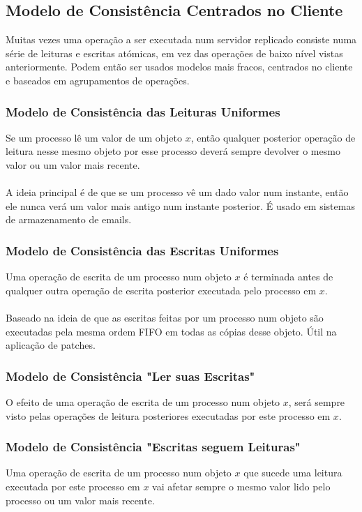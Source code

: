 \documentclass[10pt,a4paper]{report}
\begin{document}
\subsection{Modelo de Consistência Centrados no Cliente}
Muitas vezes uma operação a ser executada num servidor replicado consiste numa série de leituras e escritas atómicas, em vez das operações de baixo nível vistas anteriormente. Podem então ser usados modelos mais fracos, centrados no cliente e baseados em agrupamentos de operações.
\subsubsection{Modelo de Consistência das Leituras Uniformes}
Se um processo lê um valor de um objeto $x$, então qualquer posterior operação de leitura nesse mesmo objeto por esse processo deverá sempre devolver o mesmo valor ou um valor mais recente.\\
\\
A ideia principal é de que se um processo vê um dado valor num instante, então ele nunca verá um valor mais antigo num instante posterior. É usado em sistemas de armazenamento de emails.
\subsubsection{Modelo de Consistência das Escritas Uniformes}
Uma operação de escrita de um processo num objeto $x$ é terminada antes de qualquer outra operação de escrita posterior executada pelo processo em $x$.\\
\\
Baseado na ideia de que as escritas feitas por um processo num objeto são executadas pela mesma ordem FIFO em todas as cópias desse objeto. Útil na aplicação de patches.
\subsubsection{Modelo de Consistência "Ler suas Escritas"}
O efeito de uma operação de escrita de um processo num objeto $x$, será sempre visto pelas operações de leitura posteriores executadas por este processo em $x$.
\subsubsection{Modelo de Consistência "Escritas seguem Leituras"}
Uma operação de escrita de um processo num objeto $x$ que sucede uma leitura executada por este processo em $x$ vai afetar sempre o mesmo valor lido pelo processo ou um valor mais recente.
\end{document}
